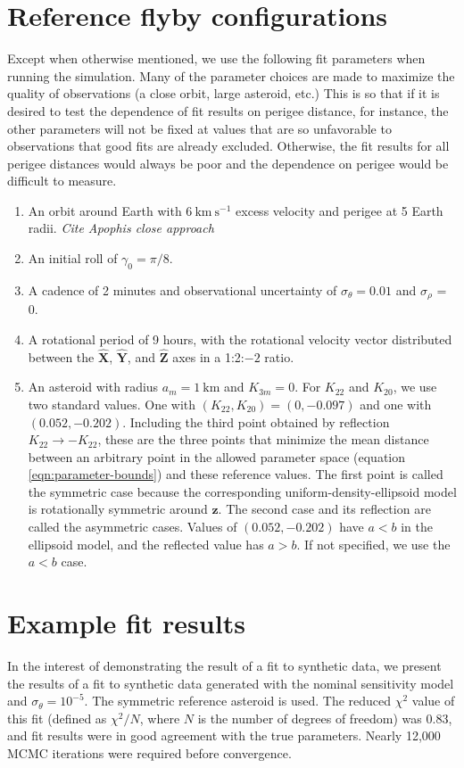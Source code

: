 \documentclass{aastex631}
\newcommand{\unit}[1]{\hat{\bm{#1}}}
\newcommand{\jtd}[1]{{\color{red}\textit{#1}}}
\newcommand{\siunit}[1]{\ \textrm{#1}}
\newcommand{\per}[1]{\ \textrm{#1}^{-1}}
\begin{document}
\section{Reference flyby configurations}
\label{app:reference-config}
Except when otherwise mentioned, we use the following fit parameters when running the simulation. Many of the parameter choices are made to maximize the quality of observations (a close orbit, large asteroid, etc.) This is so that if it is desired to test the dependence of fit results on perigee distance, for instance, the other parameters will not be fixed at values that are so unfavorable to observations that good fits are already excluded. Otherwise, the fit results for all perigee distances would always be poor and the dependence on perigee would be difficult to measure.
\begin{enumerate}
  \item An orbit around Earth with $6\siunit{km}\per{s}$ excess velocity and perigee at 5 Earth radii. \jtd{Cite Apophis close approach}
  \item An initial roll of $\gamma_0=\pi/8$.
  \item A cadence of 2 minutes and observational uncertainty of $\sigma_\theta = 0.01$ and $\sigma_\rho$ = 0.
  \item A rotational period of 9 hours, with the rotational velocity vector distributed between the $\unit X$, $\unit Y$, and $\unit Z$ axes in a 1:2:$-2$ ratio.
  \item An asteroid with radius $a_m = 1\siunit{km}$ and $K_{3m}=0$. For $K_{22}$ and $K_{20}$, we use two standard values. One with $(K_{22}, K_{20}) = (0, -0.097)$ and one with $(0.052, -0.202)$. Including the third point obtained by reflection $K_{22}\rightarrow -K_{22}$, these are the three points that minimize the mean distance between an arbitrary point in the allowed parameter space (equation \ref{eqn:parameter-bounds}) and these reference values. The first point is called the symmetric case because the corresponding uniform-density-ellipsoid model is rotationally symmetric around $\unit z$. The second case and its reflection are called the asymmetric cases. Values of $(0.052, -0.202)$ have $a < b$ in the ellipsoid model, and the reflected value has $a > b$. If not specified, we use the $a < b$ case. 
\end{enumerate}



\section{Example fit results}
In the interest of demonstrating the result of a fit to synthetic data, we present the results of a fit to synthetic data generated with the nominal sensitivity model and $\sigma_\theta = 10^{-5}$. The symmetric reference asteroid is used. The reduced $\chi^2$ value of this fit (defined as $\chi^2 / N$, where $N$ is the number of degrees of freedom) was 0.83, and fit results were in good agreement with the true parameters. Nearly 12,000 MCMC iterations were required before convergence.
\end{document}
